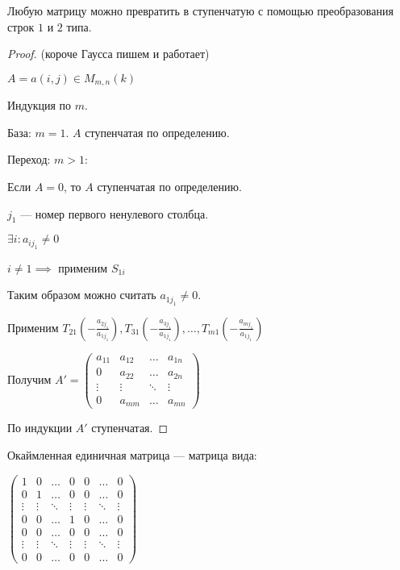 \begin{theorem-non}
    Любую матрицу можно превратить в ступенчатую с помощью преобразования строк $1$ и $2$ типа.
\end{theorem-non}

\begin{proof} (короче Гаусса пишем и работает)

    $A = a(i, j) \in M_{m, n}(k)$

    Индукция по $m$.

    База: $m = 1$. $A$ ступенчатая по определению.

    Переход: $m > 1$:

    Если $A = 0$, то $A$ ступенчатая по определению.

    $j_1$ --- номер первого ненулевого столбца. 

    $\exists i : a_{ij_1} \neq 0$

    $i \neq 1 \implies$ применим $S_{1i}$

    Таким образом можно считать $a_{1j_1} \neq 0$.

    Применим $T_{21} \left( -\frac{a_{2j_1}}{a_{1j_1}} \right), T_{31} \left( -\frac{a_{3j_1}}{a_{1j_1}} \right), \ldots, T_{m1} \left( -\frac{a_{mj_1}}{a_{1j_1}} \right)$

    Получим $A' = \begin{pmatrix} a_{11} & a_{12} & \ldots & a_{1n} \\ 0 & a_{22} & \ldots & a_{2n} \\ \vdots & \vdots & \ddots & \vdots \\ 0 & a_{mm} & \ldots & a_{mn} \end{pmatrix}$

    По индукции $A'$ ступенчатая.
\end{proof}

\begin{defn}
    Окаймленная единичная матрица --- матрица вида:

    $\begin{pmatrix}
        1 & 0 & \ldots & 0 & 0 & \ldots & 0 \\
        0 & 1 & \ldots & 0 & 0 & \ldots & 0 \\
        \vdots & \vdots & \ddots & \vdots & \vdots & \ddots & \vdots \\
        0 & 0 & \ldots & 1 & 0 & \ldots & 0 \\
        0 & 0 & \ldots & 0 & 0 & \ldots & 0 \\
        \vdots & \vdots & \ddots & \vdots & \vdots & \ddots & \vdots \\
        0 & 0 & \ldots & 0 & 0 & \ldots & 0
    \end{pmatrix}$
\end{defn}


